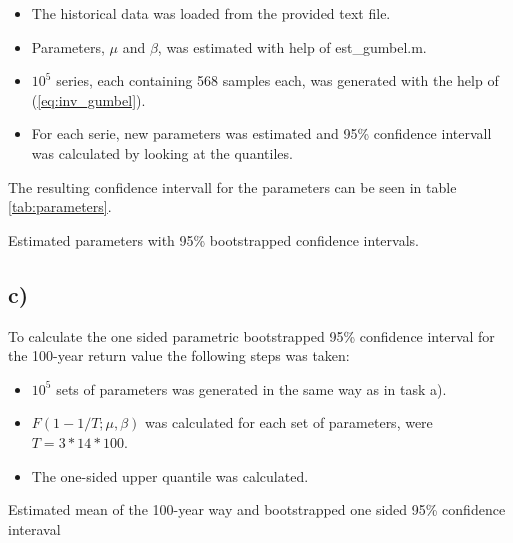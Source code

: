 \documentclass[a4paper]{article}
\begin{document}
\begin{itemize}
    \item The historical data was loaded from the provided text file.
    \item Parameters, $\mu$ and $\beta$, was estimated with help of est\_gumbel.m.
    \item $10^5$ series, each containing 568 samples each, was generated with the help of (\ref{eq:inv_gumbel}).
    \item For each serie, new parameters was estimated and 95\% confidence intervall was calculated by looking at the quantiles.
\end{itemize}

The resulting confidence intervall for the parameters can be seen in table \ref{tab:parameters}.

\begin{table}[H]
    \centering
    \caption{Estimated parameters with 95\% bootstrapped confidence intervals.}
    \label{tab:parameters}
    
\end{table}

\subsection*{c)}

To calculate the one sided parametric bootstrapped 95\% confidence interval for the 100-year return value the following steps was taken:

\begin{itemize}
    \item $10^5$ sets of parameters was generated in the same way as in task a).
    \item $F(1-1/T; \mu, \beta)$ was calculated for each set of parameters, were $T = 3*14*100$.
    \item The one-sided upper quantile was calculated.
\end{itemize}

\begin{table}[H]
    \centering
    \caption{Estimated mean of the 100-year way and bootstrapped one sided 95\% confidence interaval}
    \label{tab:bigwave}
    
\end{table}
\end{document}
